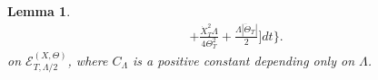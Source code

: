 \documentclass[11pt]{article}    %
\newtheorem{lemma}[theorem]{Lemma}
\begin{document}
\begin{lemma}
\begin{equation}
\begin{split}
			+ \frac{\dot{X}_{T}^2 \Lambda}{4\Theta_{T}^2} + \frac{\Lambda|\ddot{\Theta}_{T}|}{2} \Big] dt \Big\}.
\end{split}
\end{equation}
on $\mathcal{E}_{T,\Lambda/2}^{\left( X , \Theta \right)}$, where  $C_\Lambda$ is a positive constant depending only on $\Lambda$.
\end{lemma}
\end{document}
